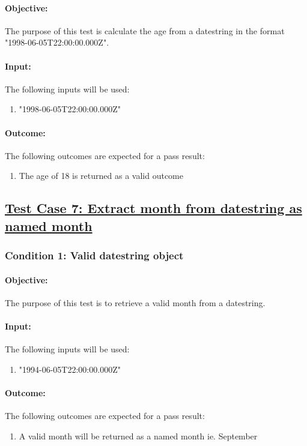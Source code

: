 \documentclass{article}
\begin{document}
\paragraph{Objective:}  The purpose of this test is calculate the age from a datestring in the format "1998-06-05T22:00:00.000Z".
\paragraph{Input:} The following inputs will be used:
\begin{enumerate}
	\item "1998-06-05T22:00:00.000Z"
\end{enumerate}
\paragraph{Outcome:} The following outcomes are expected for a pass result:
\begin{enumerate}
	\item The age of 18 is returned as a valid outcome
\end{enumerate}


\subsection{\underline{Test Case 7: Extract month from datestring as named month}}\label{test7}
\subsubsection{Condition 1: Valid datestring object }
\paragraph{Objective:} The purpose of this test is to retrieve a valid month from a datestring.
\paragraph{Input:} The following inputs will be used:
\begin{enumerate}
	\item "1994-06-05T22:00:00.000Z"
\end{enumerate}
\paragraph{Outcome:} The following outcomes are expected for a pass result:
\begin{enumerate}
	\item A valid month will be returned as a named month ie. September
\end{enumerate}
\end{document}
